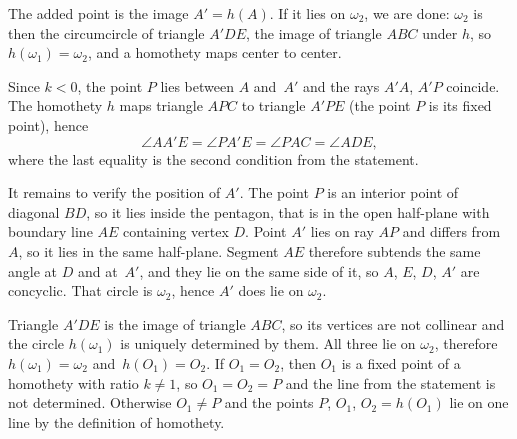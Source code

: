 {    The added point is the image $A' = h(A)$. If it lies on $\omega_2$, we are done: $\omega_2$ is then the circumcircle of triangle $A'DE$, the image of triangle $ABC$ under $h$, so $h(\omega_1) = \omega_2$, and a homothety maps center to center.

    Since $k < 0$, the point $P$ lies between $A$ and~$A'$ and the rays $A'A$, $A'P$ coincide. The homothety $h$ maps triangle $APC$ to triangle $A'PE$ (the point $P$ is its fixed point), hence
    $$
    \angle AA'E = \angle PA'E = \angle PAC = \angle ADE,
    $$
    where the last equality is the second condition from the statement.

    It remains to verify the position of $A'$. The point $P$ is an interior point of diagonal $BD$, so it lies inside the pentagon, that is in the open half-plane with boundary line $AE$ containing vertex $D$. Point $A'$ lies on ray $AP$ and differs from $A$, so it lies in the same half-plane. Segment $AE$ therefore subtends the same angle at $D$ and at~$A'$, and they lie on the same side of it, so $A$, $E$, $D$, $A'$ are concyclic. That circle is $\omega_2$, hence $A'$ does lie on $\omega_2$.

    Triangle $A'DE$ is the image of triangle $ABC$, so its vertices are not collinear and the circle $h(\omega_1)$ is uniquely determined by them. All three lie on $\omega_2$, therefore $h(\omega_1) = \omega_2$ and~$h(O_1) = O_2$. If $O_1 = O_2$, then $O_1$ is a fixed point of a homothety with ratio $k \neq 1$, so $O_1 = O_2 = P$ and the line from the statement is not determined. Otherwise $O_1 \neq P$ and the points $P$, $O_1$, $O_2 = h(O_1)$ lie on one line by the definition of homothety.
}

